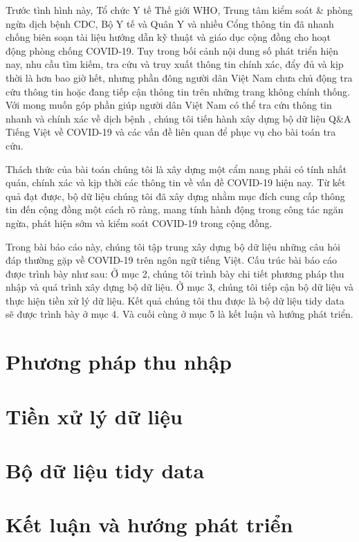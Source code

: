 \documentclass[runningheads]{llncs}
\begin{document}
Trước tình hình này, Tổ chức Y tế Thế giới WHO, Trung tâm kiểm soát \& phòng ngừa dịch bệnh CDC, Bộ Y tế và Quân Y và nhiều Cổng thông tin đã nhanh chống biên soạn tài liệu hướng dẫn kỹ thuật và giáo dục cộng đồng cho hoạt động phòng chống COVID-19. Tuy trong bối cảnh nội dung số phát triển hiện nay, nhu cầu tìm kiếm, tra cứu và truy xuất thông tin chính xác, đẩy đủ và kịp thời là hơn bao giờ hết, nhưng phần đông người dân Việt Nam chưa chủ động tra cứu thông tin hoặc đang tiếp cận thông tin trên những trang không chính thống. Với mong muốn góp phần giúp người dân Việt Nam có thể tra cứu thông tin nhanh và chính xác về dịch bệnh , chúng tôi tiến hành xây dựng bộ dữ liệu Q\&A Tiếng Việt về COVID-19 và các vấn đề liên quan để phục vụ cho bài toán tra cứu.

Thách thức của bài toán chúng tôi là xây dựng một cẩm nang phải có tính nhất quán, chính xác và kịp thời các thông tin về vấn đề COVID-19 hiện nay. Từ kết quả đạt được, bộ dữ liệu chúng tôi đã xây dựng nhằm mục đích cung cấp thông tin đến cộng đồng một cách rõ ràng, mang tính hành động trong công tác ngăn ngừa, phát hiện sớm và kiểm soát COVID-19 trong cộng đồng. 
 
Trong bài báo cáo này, chúng tôi tập trung xây dựng bộ dữ liệu những câu hỏi đáp thường gặp về COVID-19 trên ngôn ngữ tiếng Việt. Cấu trúc bài báo cáo được trình bày như sau: Ở mục 2, chúng tôi trình bày chi tiết phương pháp thu nhập và quá trình xây dựng bộ dữ liệu. Ở mục 3, chúng tôi tiếp cận bộ dữ liệu và thực hiện tiền xử lý dữ liệu. Kết quả chúng tôi thu được là bộ dữ liệu tidy data sẽ được trình bày ở mục 4. Và cuối cùng ở mục 5 là kết luận và hướng phát triển.

\section{Phương pháp thu nhập}

\section{Tiền xử lý dữ liệu}

\section{Bộ dữ liệu tidy data}

\section{Kết luận và hướng phát triển}
\end{document}
